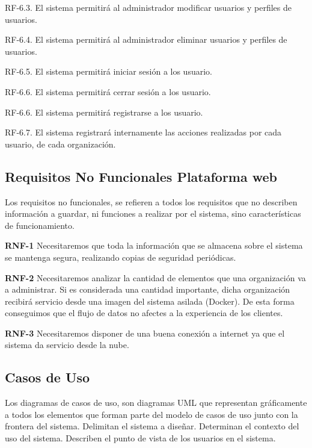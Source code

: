 \documentclass[a4paper,11pt]{book}
\begin{document}
	RF-6.3. El sistema permitirá al administrador modificar usuarios y perfiles de usuarios.
	
	RF-6.4. El sistema permitirá al administrador eliminar usuarios y perfiles de usuarios.

	RF-6.5. El sistema permitirá iniciar sesión a los usuario.
	
	RF-6.6. El sistema permitirá cerrar sesión a los usuario.
	
	RF-6.6. El sistema permitirá registrarse a los usuario.

	RF-6.7. El sistema registrará internamente las acciones realizadas por cada 	usuario, 	de cada organización. 
	
	

\subsection{Requisitos No Funcionales Plataforma web}
Los requisitos no funcionales, se refieren a todos los requisitos que no describen información a guardar, ni funciones a realizar por el sistema, sino características de funcionamiento.


\textbf{RNF-1} Necesitaremos que toda la información que se almacena sobre el sistema se mantenga segura, realizando copias de seguridad periódicas.


\textbf{RNF-2} Necesitaremos analizar la cantidad de elementos que una organización va a administrar. Si es considerada una cantidad importante, dicha organización recibirá servicio desde una imagen del sistema asilada (Docker). De esta forma conseguimos que el flujo de datos no afectes a la experiencia de los clientes.


\textbf{RNF-3} Necesitaremos disponer de una buena conexión a internet ya que el sistema da servicio desde la nube. 



\subsection{Casos de Uso}

Los diagramas de casos de uso, son diagramas UML que representan gráficamente a todos los elementos que forman parte del modelo de casos de uso junto con la frontera del sistema. Delimitan el sistema a diseñar. Determinan el contexto del uso del sistema. Describen el punto de vista de los usuarios  en el sistema.
\end{document}
